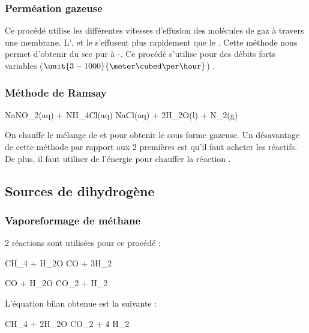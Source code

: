 	\subsubsection{Perméation gazeuse}
	Ce procédé utilise les différentes vitesses d'effusion des molécules 
	de gaz à travers une membrane. 
	L',  et le  s'effusent 
	plus rapidement que le .
	Cette méthode nous permet d'obtenir du  sec pur à 
	-. Ce procédé s'utilise pour des 
	débits forts variables ($\unit{3-1000}{\meter\cubed\per\hour}$) \cite{scf}.

	\subsubsection{Méthode de Ramsay}
	
	\begin{chemmath}
			NaNO_2(aq) + NH_4Cl(aq) \longrightarrow NaCl(aq) + 2H_2O(l) + N_2(g)
	\end{chemmath}
	
	On chauffe le mélange de  et  pour 
	obtenir le  sous forme gazeuse.
	Un désavantage de cette méthode par rapport aux 2 premières est qu'il 
	faut acheter les réactifs. De plus, il faut utiliser de l'énergie pour 
	chauffer la réaction \cite{wiki-n2}.

	\subsection{Sources de dihydrogène}
		\subsubsection{Vaporeformage de méthane}
		2 réactions sont utilisées pour ce procédé \cite{afhypac} :
		
		\begin{chemmath} 
			CH_4 + H_2O \longleftrightarrow CO + 3H_2
		\end{chemmath}
		
		\begin{chemmath}
			CO + H_2O \longleftrightarrow CO_2 + H_2
		\end{chemmath}
		
		L'équation bilan obtenue est la suivante :
		
		\begin{chemmath}
			CH_4 + 2H_2O \longleftrightarrow CO_2 + 4 H_2
		\end{chemmath}
		
